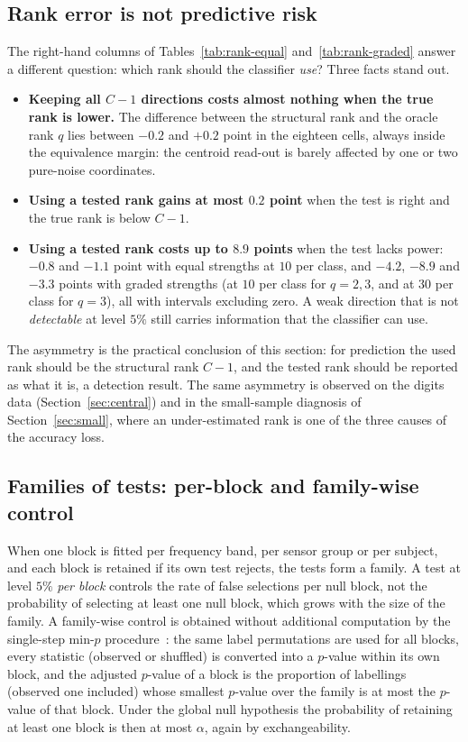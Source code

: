 \documentclass[11pt,a4paper]{article}
\theoremstyle{plain}
\theoremstyle{definition}
\theoremstyle{remark}
\begin{document}
\subsection{Rank error is not predictive risk}
\label{sec:rank-risk}
The right-hand columns of Tables~\ref{tab:rank-equal}
and~\ref{tab:rank-graded} answer a different question: which rank should
the classifier \emph{use}? Three facts stand out.
\begin{itemize}
  \item \textbf{Keeping all $C-1$ directions costs almost nothing when the
  true rank is lower.} The difference between the structural rank and the
  oracle rank $q$ lies between $-0.2$ and $+0.2$ point in the eighteen
  cells, always inside the equivalence margin: the centroid read-out is
  barely affected by one or two pure-noise coordinates.
  \item \textbf{Using a tested rank gains at most $0.2$ point} when the
  test is right and the true rank is below $C-1$.
  \item \textbf{Using a tested rank costs up to $8.9$ points} when the
  test lacks power: $-0.8$ and $-1.1$ point with equal strengths at $10$
  per class, and $-4.2$, $-8.9$ and $-3.3$ points with graded strengths
  (at $10$ per class for $q=2,3$, and at $30$ per class for $q=3$), all
  with intervals excluding zero. A weak direction that is not
  \emph{detectable} at level $5\%$ still carries information that the
  classifier can use.
\end{itemize}
The asymmetry is the practical conclusion of this section: for prediction
the used rank should be the structural rank $C-1$, and the tested rank
should be reported as what it is, a detection result. The same asymmetry
is observed on the digits data (Section~\ref{sec:central}) and in the
small-sample diagnosis of Section~\ref{sec:small}, where an
under-estimated rank is one of the three causes of the accuracy loss.

\subsection{Families of tests: per-block and family-wise control}
\label{sec:rank-fwer}
When one block is fitted per frequency band, per sensor group or per
subject, and each block is retained if its own test rejects, the tests
form a family. A test at level $5\%$ \emph{per block} controls the rate of
false selections per null block, not the probability of selecting at least
one null block, which grows with the size of the family. A family-wise
control is obtained without additional computation by the single-step
min-$p$ procedure~\cite{westfall1993}: the same label permutations are
used for all blocks, every statistic (observed or shuffled) is converted
into a $p$-value within its own block, and the adjusted $p$-value of a
block is the proportion of labellings (observed one included) whose
smallest $p$-value over the family is at most the $p$-value of that
block. Under the global null hypothesis the probability of retaining at
least one block is then at most $\alpha$, again by exchangeability.
\end{document}
